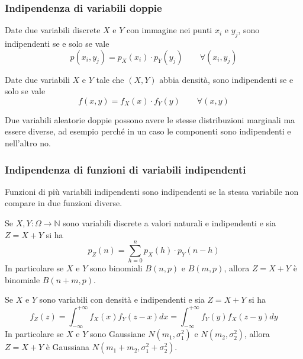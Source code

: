 \subsubsection{Indipendenza di variabili doppie}
\begin{proposition}
	Date due variabili discrete $X$ e $Y$ con immagine nei punti $x_i$ e $y_j$, sono indipendenti se e solo se vale
	\begin{equation}
		p(x_i, y_j) = p_X(x_i) \cdot p_Y(y_j) \quad\quad \forall(x_i, y_j)
	\end{equation}
\end{proposition}

\begin{proposition}
	Date due variabili $X$ e $Y$ tale che $(X,Y)$ abbia densità, sono indipendenti se e solo se vale
	\begin{equation}
		f(x,y) = f_X(x) \cdot f_Y(y) \quad\quad \forall(x,y)
	\end{equation}
\end{proposition}

\begin{observation}
	Due variabili aleatorie doppie possono avere le stesse distribuzioni marginali ma essere diverse, ad esempio perché in un caso le componenti sono indipendenti e nell'altro no.
\end{observation}

\subsubsection{Indipendenza di funzioni di variabili indipendenti}
Funzioni di più variabili indipendenti sono indipendenti se la stessa variabile non compare in due funzioni diverse.

\begin{proposition}
	Se $X,Y:\Omega \to \mathbb{N}$ sono variabili discrete a valori naturali e indipendenti e sia $Z=X+Y$ si ha
	\begin{equation}
		p_Z(n) = \sum_{h=0}^{n}p_X(h) \cdot p_Y(n-h)
	\end{equation}
	In particolare se $X$ e $Y$ sono binomiali $B(n,p)$ e $B(m,p)$, allora $Z=X+Y$ è binomiale $B(n+m,p)$.
\end{proposition}
\begin{proposition}
	Se $X$ e $Y$ sono variabili con densità e indipendenti e sia $Z=X+Y$ si ha
	\begin{equation}
		f_Z(z)=\int_{-\infty}^{+\infty}f_X(x)f_Y(z-x)dx = \int_{-\infty}^{+\infty}f_Y(y)f_X(z-y)dy
	\end{equation}
	In particolare se $X$ e $Y$ sono Gaussiane $N(m_1,\sigma_1^2)$ e $N(m_2,\sigma_2^2)$, allora $Z=X+Y$ è Gaussiana $N(m_1+m_2, \sigma_1^2+\sigma_2^2)$.
\end{proposition}

